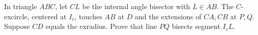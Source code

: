 In triangle $ABC$, let $CL$ be the internal angle bisector with $L\in AB$. The $C$-excircle, centered at $I_c$, touches $AB$ at $D$ and the extensions of $CA,CB$ at $P,Q$. Suppose $CD$ equals the exradius. Prove that line $PQ$ bisects segment $I_cL$.
